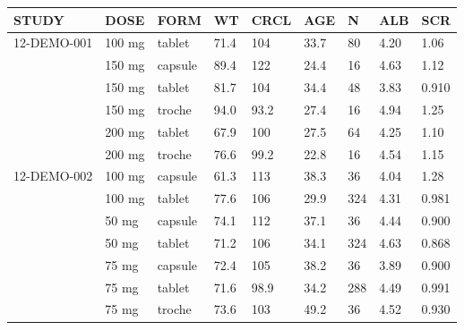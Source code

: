 {\def\arraystretch{1.4}\tabcolsep=5pt
\begin{threeparttable}
\begin{tabular}[h]{lllllllll}
\hline
STUDY & DOSE & FORM & WT & CRCL & AGE & N & ALB & SCR \\
\hline
12-DEMO-001 & 100 mg & tablet & 71.4 & 104 & 33.7 & 80 & 4.20 & 1.06 \\
 & 150 mg & capsule & 89.4 & 122 & 24.4 & 16 & 4.63 & 1.12 \\
 & 150 mg & tablet & 81.7 & 104 & 34.4 & 48 & 3.83 & 0.910 \\
 & 150 mg & troche & 94.0 & 93.2 & 27.4 & 16 & 4.94 & 1.25 \\
 & 200 mg & tablet & 67.9 & 100 & 27.5 & 64 & 4.25 & 1.10 \\
 & 200 mg & troche & 76.6 & 99.2 & 22.8 & 16 & 4.54 & 1.15 \\
12-DEMO-002 & 100 mg & capsule & 61.3 & 113 & 38.3 & 36 & 4.04 & 1.28 \\
 & 100 mg & tablet & 77.6 & 106 & 29.9 & 324 & 4.31 & 0.981 \\
 & 50 mg & capsule & 74.1 & 112 & 37.1 & 36 & 4.44 & 0.900 \\
 & 50 mg & tablet & 71.2 & 106 & 34.1 & 324 & 4.63 & 0.868 \\
 & 75 mg & capsule & 72.4 & 105 & 38.2 & 36 & 3.89 & 0.900 \\
 & 75 mg & tablet & 71.6 & 98.9 & 34.2 & 288 & 4.49 & 0.991 \\
 & 75 mg & troche & 73.6 & 103 & 49.2 & 36 & 4.52 & 0.930 \\
\hline
\end{tabular}
\end{threeparttable}
}

